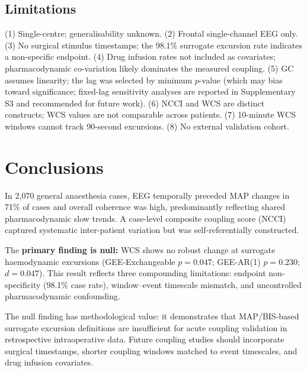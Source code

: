 \documentclass[fleqn,10pt,lineno]{wlpeerj}
\begin{document}
\subsection{Limitations}

(1) Single-centre; generalisability unknown. (2) Frontal single-channel EEG only. (3) No
surgical stimulus timestamps; the 98.1\% surrogate excursion rate indicates a non-specific
endpoint. (4) Drug infusion rates not included as covariates; pharmacodynamic co-variation
likely dominates the measured coupling. (5) GC assumes linearity; the lag was selected by
minimum $p$-value (which may bias toward significance; fixed-lag sensitivity analyses are
reported in Supplementary S3 and recommended for future work). (6) NCCI and WCS are distinct
constructs; WCS values are not comparable across patients. (7) 10-minute WCS windows cannot
track 90-second excursions. (8) No external validation cohort.

\section{Conclusions}

In 2,070 general anaesthesia cases, EEG temporally preceded MAP changes in 71\% of cases and
overall coherence was high, predominantly reflecting shared pharmacodynamic slow trends. A
case-level composite coupling score (NCCI) captured systematic inter-patient variation but was
self-referentially constructed.

The \textbf{primary finding is null:} WCS shows no robust change at surrogate haemodynamic
excursions (GEE-Exchangeable $p = 0.047$; GEE-AR(1) $p = 0.230$; $d = 0.047$). This result
reflects three compounding limitations: endpoint non-specificity (98.1\% case rate),
window--event timescale mismatch, and uncontrolled pharmacodynamic confounding.

The null finding has methodological value: it demonstrates that MAP/BIS-based surrogate
excursion definitions are insufficient for acute coupling validation in retrospective
intraoperative data. Future coupling studies should incorporate surgical timestamps, shorter
coupling windows matched to event timescales, and drug infusion covariates.

\end{document}
